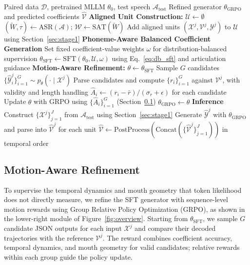 \begin{algorithm}[t]
\caption{AudioMouth Training and Inference}
\label{alg:framework}
\small
\begin{algorithmic}[1]
\REQUIRE Paired data $\mathcal{D}$, pretrained MLLM $\theta_0$, test speech $\mathcal{A}_{\mathrm{test}}$
\ENSURE Refined generator $\theta_{\mathrm{GRPO}}$ and predicted coefficients $\hat{\mathcal{V}}$
\STATE \textbf{Aligned Unit Construction:} $\mathcal{U}\leftarrow\emptyset$
    \STATE $(\tilde{W},\tau)\leftarrow\mathrm{ASR}(\mathcal{A})$; $\mathcal{W}\leftarrow\mathrm{SAT}(\tilde{W})$
    \STATE Add aligned units $(\mathcal{X}^j,\mathcal{V}^j,\mathcal{Y}^j)$ to $\mathcal{U}$ using Section~\ref{sec:stage1}
\ENDFOR
\STATE \textbf{Phoneme-Aware Balanced Coefficient Generation}
\STATE Set fixed coefficient-value weights $\omega$ for distribution-balanced supervision
\STATE $\theta_{\mathrm{SFT}}\leftarrow\mathrm{SFT}(\theta_0,\mathcal{U},\omega)$ using Eq.~\ref{eq:db_sft} and articulation guidance
\STATE \textbf{Motion-Aware Refinement:} $\theta\leftarrow\theta_{\mathrm{SFT}}$
    \STATE Sample $G$ candidates $\{\hat{\mathcal{Y}}^j_i\}_{i=1}^{G}\sim p_\theta(\cdot\mid\mathcal{X}^j)$
    \STATE Parse candidates and compute $\{r_i\}_{i=1}^{G}$ against $\mathcal{V}^j$, with validity and length handling
    \STATE $\hat{A}_i\leftarrow(r_i-\bar{r})/(\sigma_r+\epsilon)$ for each candidate
    \STATE Update $\theta$ with GRPO using $\{\hat{A}_i\}_{i=1}^{G}$ (Section~\ref{sec:stage3})
\ENDFOR
\STATE $\theta_{\mathrm{GRPO}}\leftarrow\theta$
\STATE \textbf{Inference}
\STATE Construct $\{\mathcal{X}^j\}_{j=1}^{J}$ from $\mathcal{A}_{\mathrm{test}}$ using Section~\ref{sec:stage1}
\STATE Generate $\hat{\mathcal{Y}}^j$ with $\theta_{\mathrm{GRPO}}$ and parse into $\hat{\mathcal{V}}^j$ for each unit
\STATE $\hat{\mathcal{V}}\leftarrow\mathrm{PostProcess}(\mathrm{Concat}(\{\hat{\mathcal{V}}^j\}_{j=1}^{J}))$ in temporal order
\end{algorithmic}
\end{algorithm}

\subsection{Motion-Aware Refinement}
\label{sec:stage3}

To supervise the temporal dynamics and mouth geometry that token likelihood does not directly measure, we refine the SFT generator with sequence-level motion rewards using Group Relative Policy Optimization (GRPO), as shown in the lower-right module of Figure~\ref{fig:overview}.
Starting from $\theta_{\mathrm{SFT}}$, we sample $G$ candidate JSON outputs for each input $\mathcal{X}^j$ and compare their decoded trajectories with the reference $\mathcal{V}^j$.
The reward combines coefficient accuracy, temporal dynamics, and mouth geometry for valid candidates; relative rewards within each group guide the policy update.

